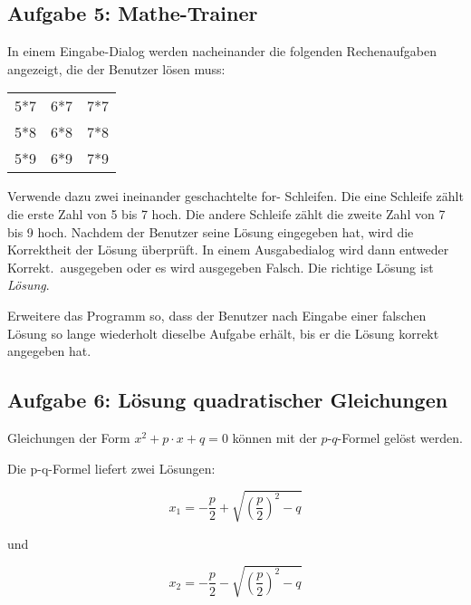 \subsection{Aufgabe 5: Mathe-Trainer}

\begin{compactenum}[a)]

\item In einem Eingabe-Dialog werden nacheinander die
folgenden Rechenaufgaben angezeigt, die der
Benutzer lösen muss:

\vspace{3mm}

\begin{tabular}{ccc}
5*7 & 6*7 & 7*7\\
5*8 & 6*8 & 7*8\\
5*9 & 6*9 & 7*9\\
\end{tabular}

Verwende dazu zwei ineinander geschachtelte for- Schleifen. Die eine Schleife
zählt die erste Zahl von 5 bis 7 hoch. Die andere Schleife zählt die zweite Zahl
von 7 bis 9 hoch. Nachdem der Benutzer seine Lösung eingegeben hat, wird die
Korrektheit der Lösung überprüft. In einem Ausgabedialog wird dann entweder
\glqq Korrekt.\grqq\ ausgegeben oder es wird ausgegeben \glqq Falsch. Die
richtige Lösung ist \emph{Lösung}.\grqq

\item Erweitere das Programm so, dass der Benutzer nach Eingabe einer falschen
 Lösung so lange wiederholt dieselbe Aufgabe erhält, bis er die Lösung korrekt
 angegeben hat.
\end{compactenum}


\subsection{Aufgabe 6: Lösung quadratischer Gleichungen}

Gleichungen der Form $x^2 + p \cdot x + q = 0$ können mit der $p$-$q$-Formel
gelöst werden.

Die p-q-Formel liefert zwei Lösungen:

\begin{minipage}{0.32\textwidth}
$$
x_1 = - \frac{p}{2} + \sqrt{\left(\frac{p}{2}\right)^2 - q}
$$
\end{minipage}
und 
\begin{minipage}{0.32\textwidth}
$$
x_2 = - \frac{p}{2} - \sqrt{\left(\frac{p}{2}\right)^2 - q}
$$
\end{minipage}

